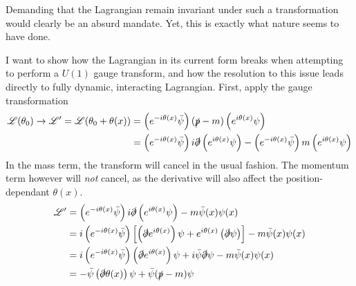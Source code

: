     Demanding that the Lagrangian remain invariant under such a transformation would clearly be an absurd mandate.
    Yet, this is exactly what nature seems to have done.

    I want to show how the Lagrangian in its current form breaks when attempting to perform a $U(1)$ gauge transform,
        and how the resolution to this issue leads directly to fully dynamic, interacting Lagrangian.
    First, apply the gauge transformation
    \begin{equation} \begin{split}
        \mathscr{L}(\theta_0) \to \mathscr{L}' = \mathscr{L}(\theta_0+\theta(x)) &=
            \left( e^{-i\theta(x)} \bar{\psi} \right) (\slashed{p} - m) \left( e^{i\theta(x)}\psi \right)
            \\ &= \left( e^{-i\theta(x)} \bar{\psi} \right) i\slashed{\partial} \left( e^{i\theta(x)}\psi \right)
                - \left( e^{-i\theta(x)} \bar{\psi} \right) m \left( e^{i\theta(x)}\psi \right)
    \end{split} \end{equation}
    In the mass term, the transform will cancel in the usual fashion.
    The momentum term however will \textit{not} cancel, as the derivative will also affect the position-dependant $\theta(x)$.
    \begin{equation} \begin{split}
        \mathscr{L}' &= \left( e^{-i\theta(x)} \bar{\psi} \right) i\slashed{\partial} \left( e^{i\theta(x)}\psi \right) - m \bar{\psi}(x) \psi(x)
        \\ &= i \left( e^{-i\theta(x)} \bar{\psi} \right) \left[
                \left( \slashed{\partial} e^{i\theta(x)} \right) \psi 
                + e^{i\theta(x)} \left( \slashed{\partial} \psi \right)
            \right] - m \bar{\psi}(x) \psi(x)
        \\ &= i \left( e^{-i\theta(x)} \bar{\psi} \right)
                \left( \slashed{\partial} e^{i\theta(x)} \right) \psi 
            + i \bar{\psi} \slashed{\partial} \psi
            - m \bar{\psi}(x) \psi(x)
        \\ &= - \bar{\psi} \left( \slashed{\partial}\theta(x) \right) \psi 
            + \bar{\psi} ( \slashed{p} - m ) \psi
    \end{split} \end{equation}

